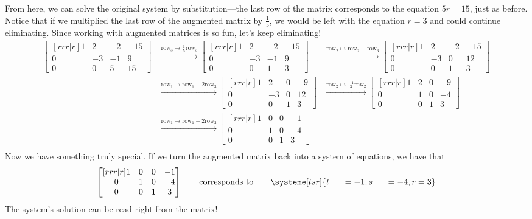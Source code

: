From here, we can solve the original system by substitution---the last
row of the matrix corresponds to the equation $5r=15$, just as before.
Notice that if we multiplied the last row of the augmented matrix by $\tfrac{1}{5}$,
we would be left with the equation $r=3$ and could continue eliminating.
Since working with augmented matrices is so fun, let's keep eliminating!
	\begin{align*}
		\begin{bmatrix}[rrr|r]
			1&2&-2 & -15\\
			0&-3&-1&9\\
			0&0&5&15
		\end{bmatrix}
		&\xrightarrow{\text{row}_3\mapsto\tfrac{1}{5}\text{row}_3}
		\begin{bmatrix}[rrr|r]
			1&2&-2 & -15\\
			0&-3&-1&9\\
			0&0&1&3
		\end{bmatrix}
		&\xrightarrow{\text{row}_2\mapsto\text{row}_2+\text{row}_3}
		\begin{bmatrix}[rrr|r]
			1&2&-2 & -15\\
			0&-3&0&12\\
			0&0&1&3
		\end{bmatrix}\\
		&\xrightarrow{\text{row}_1\mapsto\text{row}_1+2\text{row}_3}
		\begin{bmatrix}[rrr|r]
			1&2&0 & -9\\
			0&-3&0&12\\
			0&0&1&3
		\end{bmatrix}
		&\xrightarrow{\text{row}_2\mapsto\tfrac{-1}{3}\text{row}_2}
		\begin{bmatrix}[rrr|r]
			1&2&0 & -9\\
			0&1&0&-4\\
			0&0&1&3
		\end{bmatrix}\\
		&\xrightarrow{\text{row}_1\mapsto\text{row}_1-2\text{row}_2}
		\begin{bmatrix}[rrr|r]
			1&0&0 & -1\\
			0&1&0&-4\\
			0&0&1&3
		\end{bmatrix}\\
	\end{align*}
Now we have something truly special. If we turn the augmented
matrix back into a system of equations, we have that 
	\[
		\begin{bmatrix}[rrr|r]
			1&0&0 & -1\\
			0&1&0&-4\\
			0&0&1&3
		\end{bmatrix}\\
		\qquad\text{corresponds to}\qquad
		\systeme[tsr]{
			t\phantom{++}=-1,
			s\phantom{++}=-4,
			r=3
		}
	\]
The system's solution can be read right from the matrix!

